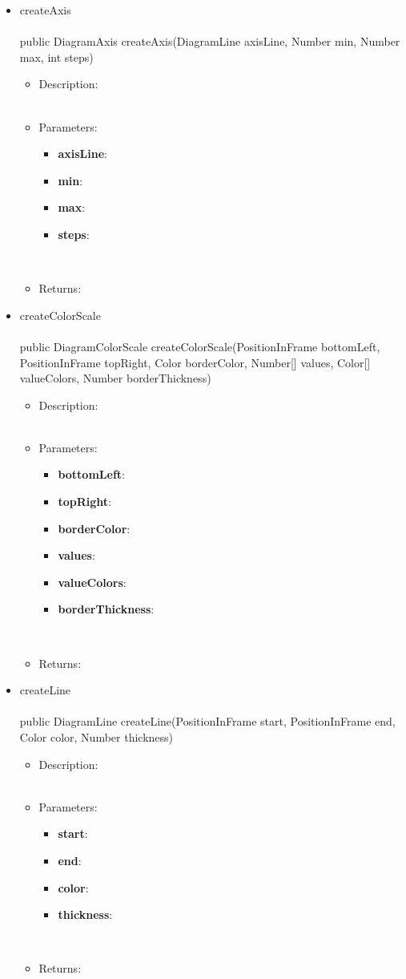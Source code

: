 \documentclass[10pt,a4paper]{report}
\newcommand{\public}{\textcolor{col:public}{public }}
\newcommand{\type}[1]{\textcolor{col:class}{#1}}
\newcommand{\methoddesc}[8]{
#4
\leavevmode \\
\leavevmode \\
#1#2\type{#3} #4(#5)
\begin{itemize}[label=-]
    \item Description: \leavevmode \\ #6 \leavevmode \\
    \item Parameters: \leavevmode \\ #7 \leavevmode \\
    \item Returns: \leavevmode \\ #8
\end{itemize}
}
\newcommand{\paramdesc}[2]{
    \textbf{#1}: #2
}
\begin{document}
{\begin{itemize}
        {}{
            \begin{itemize}
                \item \paramdesc{bottomLeft}{}
                \item \paramdesc{topRight}{}
                \item \paramdesc{color}{}
                \item \paramdesc{caption}{}
                \item \paramdesc{borderThickness}{}
            \end{itemize}
        }{}
        \item \methoddesc{\public}{}{DiagramAxis}{createAxis}{\type{DiagramLine} axisLine, \type{Number} min, \type{Number} max, \type{int} steps}
        {}{
            \begin{itemize}
                \item \paramdesc{axisLine}{}
                \item \paramdesc{min}{}
                \item \paramdesc{max}{}
                \item \paramdesc{steps}{}
            \end{itemize}
        }{}
        \item \methoddesc{\public}{}{DiagramColorScale}{createColorScale}{\type{PositionInFrame} bottomLeft, \type{PositionInFrame} topRight, \type{Color} borderColor, \type{Number[]} values, \type{Color[]} valueColors, \type{Number} borderThickness}
        {}{
            \begin{itemize}
                \item \paramdesc{bottomLeft}{}
                \item \paramdesc{topRight}{}
                \item \paramdesc{borderColor}{}
                \item \paramdesc{values}{}
                \item \paramdesc{valueColors}{}
                \item \paramdesc{borderThickness}{}
            \end{itemize}
        }{}
        \item \methoddesc{\public}{}{DiagramLine}{createLine}{\type{PositionInFrame} start, \type{PositionInFrame} end, \type{Color} color, \type{Number} thickness}
        {}{
            \begin{itemize}
                \item \paramdesc{start}{}
                \item \paramdesc{end}{}
                \item \paramdesc{color}{}
                \item \paramdesc{thickness}{}
            \end{itemize}
        }{}
    \end{itemize}
}
\end{document}
